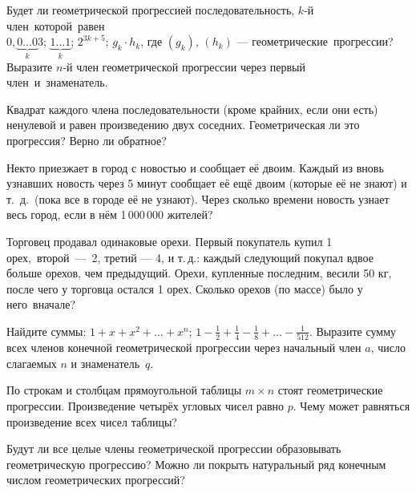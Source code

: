 \documentclass[a4paper,11pt]{article}
\begin{document}
Будет ли геометрической прогрессией последовательность, $k$-й
член~\hbox{которой}~ра\-вен\\
$0,\underbrace{0\ldots0}_{k}3$;
 $\underbrace{1\ldots1}_{k}$;
 $2^{3k+5}$;
 $g_k\cdot h_k$, где $(g_k)$, $(h_k)$ --- геометрические~\hbox{прогрессии?}\\
Выразите $n$-й член геометрической прогрессии через
первый член~и~\hbox{знаменатель.}

 Квадрат каждого члена последовательности (кроме крайних,
если они есть) ненулевой и равен произведению двух соседних. %
Геометрическая ли это прогрессия?
 Верно ли обратное?

 Некто приезжает в город с новостью и
сообщает её двоим. Каждый из вновь узнавших новость через 5 минут
сообщает её ещё двоим (которые её не знают) и
т.~д.~(пока все в городе её не узнают).
Через сколько времени новость узнает весь город, если в нём
1\,000\,000 жителей?

 Торговец продавал одинаковые орехи.
Первый покупатель купил 1 орех,~\hbox{второй ---~2,}
третий --- 4, и т.\,д.: каждый следующий %
покупал вдвое больше орехов, чем предыдущий.
Орехи, купленные последним, весили 50 кг, после чего у торговца
остался 1 орех. Сколько орехов (по массе) было у него~вначале?

 Найдите суммы:
$1+x+x^2+\ldots+x^n$;
$1-\frac12+\frac14-\frac18+\ldots-\frac1{512}$.
%
 Выразите сумму
всех членов конечной геометрической прогрессии через начальный член $a$,
число слагаемых $n$ и знаменатель~$q$.


По строкам и столбцам прямоугольной таблицы %
$m\times n$ стоят геометрические прогрессии.
Произведение четырёх угловых чисел равно $p$. Чему может равняться произведение всех чисел таблицы?

 Будут ли все целые члены геометрической прогрессии образовывать геометрическую прогрессию?
 Можно ли покрыть натуральный ряд конечным числом геометрических прогрессий?


%

\end{document}
